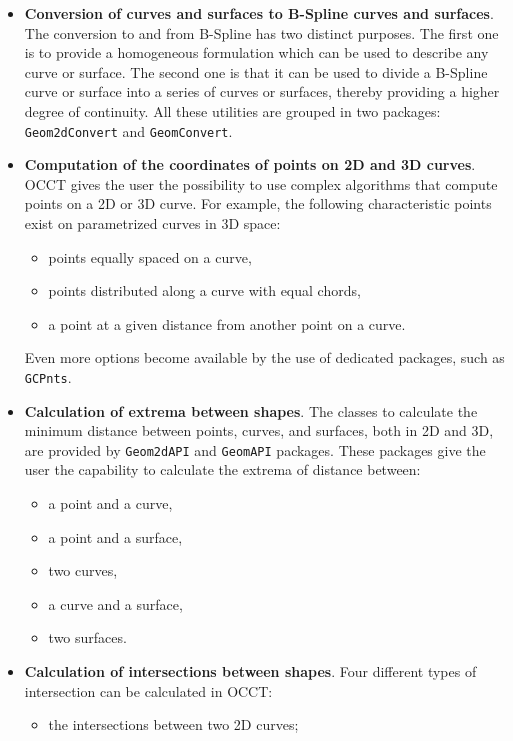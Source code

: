 \begin{itemize}
\begin{itemize}
	\end{itemize}
\item \textbf{Conversion of curves and surfaces to B-Spline curves and surfaces}. The conversion to and from B-Spline has two distinct purposes. The first one is to provide a homogeneous formulation which can be used to describe any curve or surface. The second one is that it can be used to divide a B-Spline curve or surface into a series of curves or surfaces, thereby providing a higher degree of continuity. All these utilities are grouped in two packages: \lstinline[language=Java]!Geom2dConvert! and \lstinline[language=Java]!GeomConvert!.
\item \textbf{Computation of the coordinates of points on 2D and 3D curves}. \gls{OCCT} gives the user the possibility to use complex algorithms that compute points on a 2D or 3D curve. For example, the following characteristic points exist on parametrized curves in 3D space:
	\begin{itemize}
	\item points equally spaced on a curve,
	\item points distributed along a curve with equal chords,
	\item a point at a given distance from another point on a curve.
	\end{itemize}
Even more options become available by the use of dedicated packages, such as \lstinline[language=Java]!GCPnts!.
\item \textbf{Calculation of extrema between shapes}. The classes to calculate the minimum distance between points, curves, and surfaces, both in 2D and 3D, are provided by \lstinline[language=Java]!Geom2dAPI! and \lstinline[language=Java]!GeomAPI! packages. These packages give the user the capability to calculate the extrema of distance between:
	\begin{itemize}
	\item a point and a curve,
	\item a point and a surface,
	\item two curves,
	\item a curve and a surface,
	\item two surfaces.
	\end{itemize}
\item \textbf{Calculation of intersections between shapes}. Four different types of intersection can be calculated in \gls{OCCT}:
	\begin{itemize}
	\item the intersections between two 2D curves;

\end{itemize}
\end{itemize}
